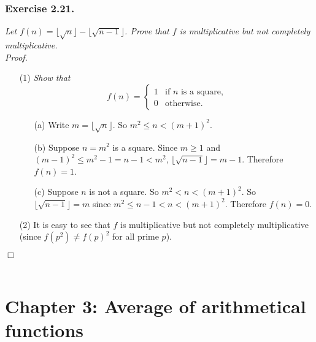 \documentclass{article}
\begin{document}
\subsubsection*{Exercise 2.21.}
\emph{Let $f(n) = \lfloor \sqrt{n} \rfloor - \lfloor \sqrt{n-1} \rfloor$.
Prove that $f$ is multiplicative but not completely multiplicative.} \\



\emph{Proof.}
\begin{enumerate}
\item[(1)]
  \emph{Show that}
  \begin{equation*}
    f(n) =
    \begin{cases}
      1 & \text{if $n$ is a square,} \\
      0 & \text{otherwise}.
    \end{cases}
  \end{equation*}
  \begin{enumerate}
  \item[(a)]
    Write $m = \lfloor \sqrt{n} \rfloor$. So $m^2 \leq n < (m+1)^2$.

  \item[(b)]
    Suppose $n = m^2$ is a square.
    Since $m \geq 1$ and $(m-1)^2 \leq m^2 - 1 = n - 1 < m^2$,
    $\lfloor \sqrt{n-1} \rfloor = m - 1$.
    Therefore $f(n) = 1$.

  \item[(c)]
    Suppose $n$ is not a square.
    So $m^2 < n < (m+1)^2$.
    So $\lfloor \sqrt{n-1} \rfloor = m$ since $m^2 \leq n - 1 < n < (m+1)^2$.
    Therefore $f(n) = 0$.
  \end{enumerate}

\item[(2)]
  It is easy to see that $f$ is multiplicative but not completely multiplicative
  (since $f(p^2) \neq f(p)^2$ for all prime $p$).
\end{enumerate}
$\Box$ \\\\






\newpage
\section*{Chapter 3: Average of arithmetical functions \\}
\end{document}
